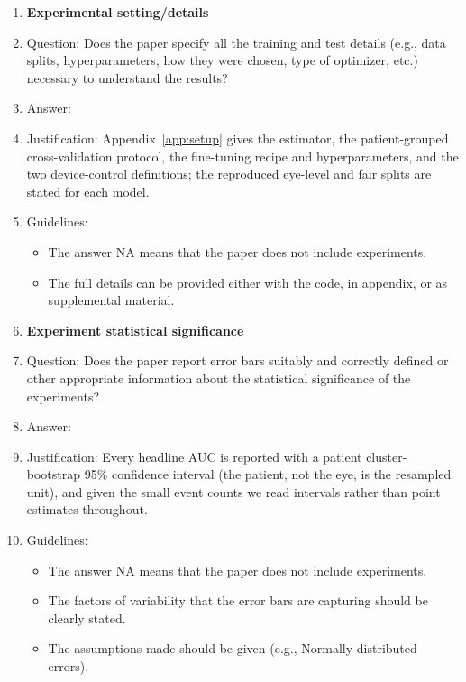 \begin{enumerate}
\item {\bf Experimental setting/details}
    \item[] Question: Does the paper specify all the training and test details (e.g., data splits, hyperparameters, how they were chosen, type of optimizer, etc.) necessary to understand the results?
    \item[] Answer: \answerYes{}
    \item[] Justification: Appendix~\ref{app:setup} gives the estimator, the patient-grouped cross-validation protocol, the fine-tuning recipe and hyperparameters, and the two device-control definitions; the reproduced eye-level and fair splits are stated for each model.
    \item[] Guidelines:
    \begin{itemize}
        \item The answer NA means that the paper does not include experiments.
        \item The full details can be provided either with the code, in appendix, or as supplemental material.
    \end{itemize}

\item {\bf Experiment statistical significance}
    \item[] Question: Does the paper report error bars suitably and correctly defined or other appropriate information about the statistical significance of the experiments?
    \item[] Answer: \answerYes{}
    \item[] Justification: Every headline AUC is reported with a patient cluster-bootstrap \num{95}\% confidence interval (the patient, not the eye, is the resampled unit), and given the small event counts we read intervals rather than point estimates throughout.
    \item[] Guidelines:
    \begin{itemize}
        \item The answer NA means that the paper does not include experiments.
        \item The factors of variability that the error bars are capturing should be clearly stated.
        \item The assumptions made should be given (e.g., Normally distributed errors).
    \end{itemize}


\end{enumerate}
